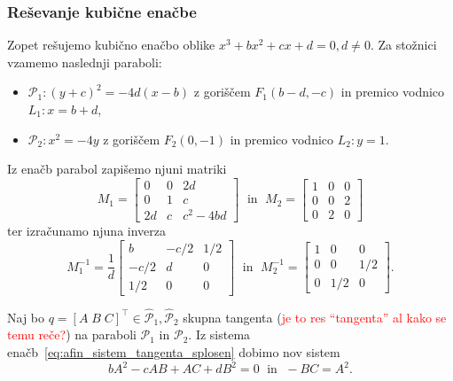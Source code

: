  \subsubsection*{Reševanje kubične enačbe}

 Zopet rešujemo kubično enačbo oblike $ x^3 + bx^2 + cx + d = 0, d \neq 0$. Za stožnici vzamemo naslednji paraboli:
 \begin{itemize}
    \item $\mathcal{P}_1: (y+c)^2 = -4d(x-b)$ z goriščem $F_1 (b - d, -c)$ in premico vodnico $L_1: x = b + d$,
    \item $\mathcal{P}_2: x^2 = -4y$ z goriščem $F_2 (0, -1)$ in premico vodnico $L_2: y = 1$.
 \end{itemize}

 Iz enačb parabol zapišemo njuni matriki
$$ M_1 =
    \begin{bmatrix}
        0 & 0 & 2d\\
        0 & 1 & c\\
        2d & c & c^2-4bd
    \end{bmatrix}
    \; \text{ in } \; M_2 =
    \begin{bmatrix}
        1 & 0 & 0\\
        0 & 0 & 2\\
        0 & 2 & 0
    \end{bmatrix}
$$
ter izračunamo njuna inverza
$$ M^{-1}_1 = \frac{1}{d}
    \begin{bmatrix}
        b & -c/2 & 1/2\\
        -c/2 & d & 0\\
        1/2 & 0 & 0
    \end{bmatrix}
\; \text{ in } \; M^{-1}_2 =
    \begin{bmatrix}
        1 & 0 & 0\\
        0 & 0 & 1/2\\
        0 & 1/2 & 0
    \end{bmatrix}.
$$

Naj bo $q = [A\;B\; C]^\intercal \in \mathcal{\hat{P}}_1, \mathcal{\hat{P}}_2$ skupna tangenta (\textcolor{red}{je to res ``tangenta'' al kako se temu reče?}) na paraboli $\mathcal{P}_1$ in $\mathcal{P}_2$. Iz sistema enačb~\ref{eq:afin_sistem_tangenta_splosen} dobimo nov sistem
\begin{equation}
    \label{eq:afin_sistem_tangenta_ABC_kub}
    bA^2 - cAB + AC + dB^2 = 0 \; \text{ in } \; -BC = A^2.
\end{equation}

